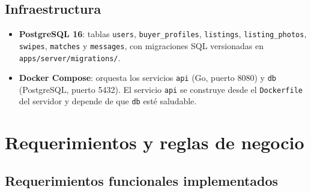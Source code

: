 \documentclass[12pt,a4paper]{article}
\begin{document}
\subsection{Infraestructura}

\begin{itemize}
  \item \textbf{PostgreSQL 16}: tablas \texttt{users}, \texttt{buyer\_profiles},
        \texttt{listings}, \texttt{listing\_photos}, \texttt{swipes}, \texttt{matches} y
        \texttt{messages}, con migraciones SQL versionadas en \texttt{apps/server/migrations/}.
  \item \textbf{Docker Compose}: orquesta los servicios \texttt{api} (Go, puerto 8080) y
        \texttt{db} (PostgreSQL, puerto 5432). El servicio \texttt{api} se construye desde el
        \texttt{Dockerfile} del servidor y depende de que \texttt{db} esté saludable.
\end{itemize}

\section{Requerimientos y reglas de negocio}

\subsection{Requerimientos funcionales implementados}
\end{document}
